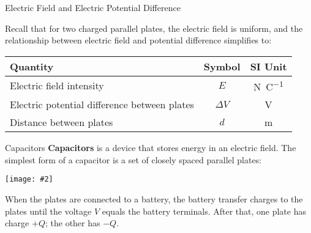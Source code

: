 \documentclass[12pt,aspectratio=169]{beamer}
\newcommand{\pic}[2]{\texttt{[image: \#2]}}
\newcommand{\eq}[2]{\vspace{#1}{\Large\begin{displaymath}#2\end{displaymath}}}
\begin{document}
\begin{frame}{Electric Field and Electric Potential Difference}
  \begin{center}
  \end{center}
  \vspace{-.1in}Recall that for two charged parallel plates, the electric field
  is uniform, and the relationship between electric field and potential
  difference simplifies to:

  \eq{-.2in}{
    \boxed{E=\frac{\Delta V}{d}}
    \quad\text{or}\quad
    \boxed{\Delta V=Ed}
  }
  \begin{center}
    \begin{tabular}{l|c|c}
      \rowcolor{pink}
      \textbf{Quantity} & \textbf{Symbol} & \textbf{SI Unit} \\ \hline
      Electric field intensity & $E$ & \si{\newton\per\coulomb}\\
      Electric potential difference between plates & $\Delta V$ &
      \si{\volt} \\
      Distance between plates       & $d$ & \si{\metre}
    \end{tabular}
  \end{center}
\end{frame}



\begin{frame}{Capacitors}
  \textbf{Capacitors} is a device that stores energy in an electric field. The
  simplest form of a capacitor is a set of closely spaced parallel plates:
  \begin{center}
    \pic{.5}{cap19}
  \end{center}
  When the plates are connected to a battery, the battery transfer charges to
  the plates until the voltage $V$ equals the battery terminals. After that,
  one plate has charge $+Q$; the other has $-Q$.
\end{frame}
\end{document}
